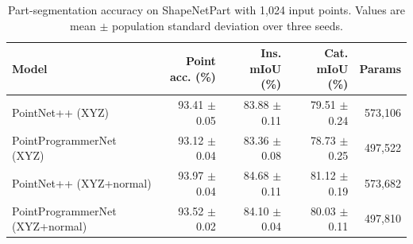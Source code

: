 \begin{table}[t]
\centering
\caption{Part-segmentation accuracy on ShapeNetPart with 1,024 input points. Values are mean $\pm$ population standard deviation over three seeds.}
\label{tab:main_accuracy}
\begin{tabular}{lrrrr}
\toprule
Model & Point acc. (\%) & Ins. mIoU (\%) & Cat. mIoU (\%) & Params \\
\midrule
PointNet++ (XYZ) & 93.41 $\pm$ 0.05 & 83.88 $\pm$ 0.11 & 79.51 $\pm$ 0.24 & 573,106 \\
PointProgrammerNet (XYZ) & 93.12 $\pm$ 0.04 & 83.36 $\pm$ 0.08 & 78.73 $\pm$ 0.25 & 497,522 \\
PointNet++ (XYZ+normal) & 93.97 $\pm$ 0.04 & 84.68 $\pm$ 0.11 & 81.12 $\pm$ 0.19 & 573,682 \\
PointProgrammerNet (XYZ+normal) & 93.52 $\pm$ 0.02 & 84.10 $\pm$ 0.04 & 80.03 $\pm$ 0.11 & 497,810 \\
\bottomrule
\end{tabular}
\end{table}
